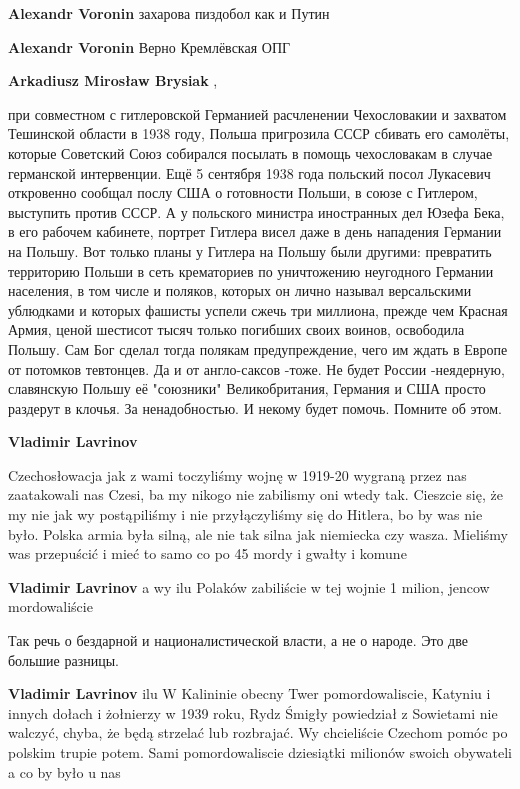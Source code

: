 \begin{itemize}
\begin{itemize}
\textbf{Alexandr Voronin} захарова пиздобол как и Путин

\textbf{Alexandr Voronin} Верно Кремлёвская ОПГ

\textbf{Arkadiusz Mirosław Brysiak} , 

при совместном с гитлеровской Германией расчленении Чехословакии и захватом
Тешинской области в 1938 году, Польша пригрозила СССР сбивать его самолёты,
которые Советский Союз собирался посылать в помощь чехословакам в случае
германской интервенции. Ещё 5 сентября 1938 года польский посол Лукасевич
откровенно сообщал послу США о готовности Польши, в союзе с Гитлером, выступить
против СССР. А у польского министра иностранных дел Юзефа Бека, в его рабочем
кабинете, портрет Гитлера висел даже в день нападения Германии на Польшу. Вот
только планы у Гитлера на Польшу были другими: превратить территорию Польши в
сеть крематориев по уничтожению неугодного Германии населения, в том числе и
поляков, которых он лично называл версальскими ублюдками и которых фашисты
успели сжечь три миллиона, прежде чем Красная Армия, ценой шестисот тысяч
только погибших своих воинов, освободила Польшу. Сам Бог сделал тогда полякам
предупреждение, чего им ждать в Европе от потомков тевтонцев. Да и от
англо-саксов -тоже. Не будет России -неядерную, славянскую Польшу её "союзники"
Великобритания, Германия и США просто раздерут в клочья. За ненадобностью. И
некому будет помочь. Помните об этом.

\textbf{Vladimir Lavrinov} 

Czechosłowacja jak z wami toczyliśmy wojnę w 1919-20 wygraną przez nas
zaatakowali nas Czesi, ba my nikogo nie zabilismy oni wtedy tak. Cieszcie się,
że my nie jak wy postąpiliśmy i nie przyłączyliśmy się do Hitlera, bo by was
nie było. Polska armia była silną, ale nie tak silna jak niemiecka czy wasza.
Mieliśmy was przepuścić i mieć to samo co po 45 mordy i gwałty i komune

\textbf{Vladimir Lavrinov} a wy ilu Polaków zabiliście w tej wojnie 1 milion, jencow mordowaliście

Так речь о бездарной и националистической власти, а не о народе. Это две большие разницы.

\textbf{Vladimir Lavrinov} ilu W Kalininie obecny Twer pomordowaliscie, Katyniu i innych dołach i żołnierzy w 1939 roku, Rydz Śmigły powiedział z Sowietami nie walczyć, chyba, że będą strzelać lub rozbrajać. Wy chcieliście Czechom pomóc po polskim trupie potem. Sami pomordowaliscie dziesiątki milionów swoich obywateli a co by było u nas


\end{itemize}
\end{itemize}
